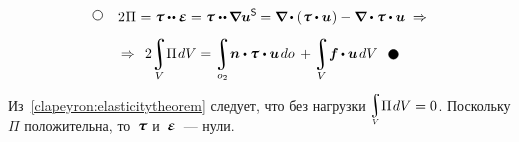 \begin{otherlanguage}{russian}
\vspace{-0.64em}\begin{multline*}
\tikz[baseline=-1ex] \draw [line width=.5pt, color=black, fill=white] (0, 0) circle (.8ex);
\hspace{2.5ex}
2 \hspace{0.1ex} \Pi \hspace{0.1ex} = \mathboldtau \dotdotp \mathboldepsilon =
\mathboldtau \hspace{0.1ex} \dotdotp \hspace{-0.12ex} \boldnabla \bm{u}^{\mathsf{S}} \hspace{-0.12ex} =
\boldnabla \hspace{-0.1ex} \dotp \left( \hspace{0.1ex} \mathboldtau \dotp \bm{u} \hspace{0.1ex} \right) -
\tikzmark{beginMinusLoad} \boldnabla \dotp \mathboldtau \tikzmark{endMinusLoad} \dotp \bm{u} \;\Rightarrow \\[.5em]
\Rightarrow\;\,
\displaystyle 2 \hspace{-0.16em}
\integral\displaylimits_V \hspace{-0.5ex} \Pi \hspace{0.2ex} dV =
\integral\displaylimits_{o_2} \hspace{-0.4ex} \tikzmark{beginSurfaceLoad} \bm{n} \dotp \mathboldtau \tikzmark{endSurfaceLoad} \hspace{0.1ex} \dotp \bm{u} \hspace{0.25ex} do \hspace{.4ex} +
\integral\displaylimits_V \hspace{-0.4ex} \bm{f} \hspace{-0.1ex} \dotp \bm{u} \hspace{0.25ex} dV
\hspace{1.8ex}
\tikz[baseline=-0.6ex] \draw [color=black, fill=black] (0, 0) circle (.8ex);
\end{multline*}%
%

\vspace{-0.2em} Из~\eqref{clapeyron:elasticitytheorem} следует, что без нагрузки ${\hspace{-0.1ex}\raisemath{.15em}{\scalebox{0.75}{$\smash{\displaystyle\integral\limits_V}$}} \Pi \hspace{0.2ex} dV = 0\vspace{-0.3em}}$. По\-сколь\-ку $\Pi$ положительна, то~$\mathboldtau$ и~$\mathboldepsilon$~--- нули.


\end{otherlanguage}
